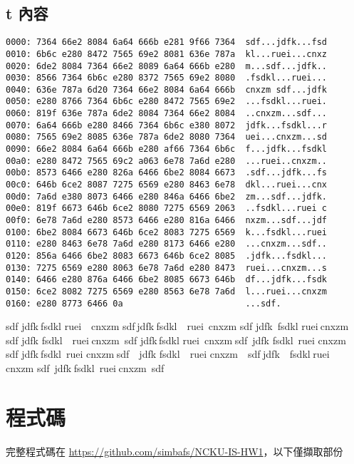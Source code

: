 \documentclass[12pt,a4paper]{article}
\begin{document}
\subsection{t 內容}
\begin{lstlisting}
0000: 7364 66e2 8084 6a64 666b e281 9f66 7364  sdf...jdfk...fsd
0010: 6b6c e280 8472 7565 69e2 8081 636e 787a  kl...ruei...cnxz
0020: 6de2 8084 7364 66e2 8089 6a64 666b e280  m...sdf...jdfk..
0030: 8566 7364 6b6c e280 8372 7565 69e2 8080  .fsdkl...ruei...
0040: 636e 787a 6d20 7364 66e2 8084 6a64 666b  cnxzm sdf...jdfk
0050: e280 8766 7364 6b6c e280 8472 7565 69e2  ...fsdkl...ruei.
0060: 819f 636e 787a 6de2 8084 7364 66e2 8084  ..cnxzm...sdf...
0070: 6a64 666b e280 8466 7364 6b6c e380 8072  jdfk...fsdkl...r
0080: 7565 69e2 8085 636e 787a 6de2 8080 7364  uei...cnxzm...sd
0090: 66e2 8084 6a64 666b e280 af66 7364 6b6c  f...jdfk...fsdkl
00a0: e280 8472 7565 69c2 a063 6e78 7a6d e280  ...ruei..cnxzm..
00b0: 8573 6466 e280 826a 6466 6be2 8084 6673  .sdf...jdfk...fs
00c0: 646b 6ce2 8087 7275 6569 e280 8463 6e78  dkl...ruei...cnx
00d0: 7a6d e380 8073 6466 e280 846a 6466 6be2  zm...sdf...jdfk.
00e0: 819f 6673 646b 6ce2 8080 7275 6569 2063  ..fsdkl...ruei c
00f0: 6e78 7a6d e280 8573 6466 e280 816a 6466  nxzm...sdf...jdf
0100: 6be2 8084 6673 646b 6ce2 8083 7275 6569  k...fsdkl...ruei
0110: e280 8463 6e78 7a6d e280 8173 6466 e280  ...cnxzm...sdf..
0120: 856a 6466 6be2 8083 6673 646b 6ce2 8085  .jdfk...fsdkl...
0130: 7275 6569 e280 8063 6e78 7a6d e280 8473  ruei...cnxzm...s
0140: 6466 e280 876a 6466 6be2 8085 6673 646b  df...jdfk...fsdk
0150: 6ce2 8082 7275 6569 e280 8563 6e78 7a6d  l...ruei...cnxzm
0160: e280 8773 6466 0a                        ...sdf.
\end{lstlisting}
sdf jdfk fsdkl ruei cnxzm sdf jdfk fsdkl ruei cnxzm sdf jdfk fsdkl ruei cnxzm sdf jdfk fsdkl　ruei cnxzm sdf jdfk fsdkl ruei cnxzm sdf jdfk fsdkl ruei cnxzm　sdf jdfk fsdkl ruei cnxzm sdf jdfk fsdkl ruei cnxzm sdf jdfk fsdkl ruei cnxzm sdf jdfk fsdkl ruei cnxzm sdf

\section{程式碼}
完整程式碼在 \url{https://github.com/simbafs/NCKU-IS-HW1}，以下僅擷取部份
\end{document}
